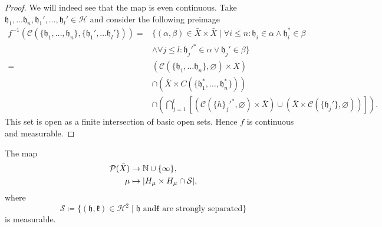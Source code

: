 \begin{proof}
  We will indeed see that the map is even continuous. Take \(\mathfrak{h}_1,\dots \mathfrak{h}_n, \mathfrak{h}_1', \dots, \mathfrak{h}_l' \in \mathcal{H}\) and consider the following preimage
  \begin{align*}
    f^{-1}(\mathcal{C}(\{\mathfrak{h}_1, \dots, \mathfrak{h}_n\}, \{\mathfrak{h}_1', \dots \mathfrak{h}_l'\}))  = & \{(\alpha, \beta) \in \bar X \times \bar X \mid \forall i \leq n\colon \mathfrak{h}_i \in \alpha \wedge \mathfrak{h}_i^\ast \in \beta\\
    & \wedge \forall j \leq l \colon \mathfrak{h}_j'^\ast \in \alpha \vee \mathfrak{h}_j' \in \beta\}\\
    = & (\mathcal{C}(\{\mathfrak{h}_1, \dots \mathfrak{h}_n\}, \varnothing)  \times \bar X)\\
    & \cap (\bar X \times C(\{\mathfrak{h}_1^\ast, \dots, \mathfrak{h}_n^\ast\}))\\
                                                                                                                  & \cap \left ( \bigcap_{j=1}^l \left[(\mathcal{C}(\{h\}_j'^\ast, \varnothing) \times \bar X) \cup (\bar X \times \mathcal{C}(\{\mathfrak{h}_j'\}, \varnothing))\right]\right).
  \end{align*}
  This set is open as a finite intersection of basic open sets. Hence \(f\) is continuous and measurable.
\end{proof}

\begin{lemma}
  \label{lem:measurable-str-sep}
  The map
  \begin{align*}
    \mathcal{P}(\bar X) & \to \mathbb{N} \cup \{\infty\},\\
    \mu & \mapsto |H_\mu\times H_\mu \cap \mathcal{S}|,
  \end{align*}
  where
  \[
    \mathcal{S}\coloneqq \{(\mathfrak{h},\mathfrak{k}) \in \mathcal{H}^2 \mid \mathfrak{h} \text{ and} \mathfrak{k} \text{ are strongly separated}\}
  \]
  is measurable.
\end{lemma}



